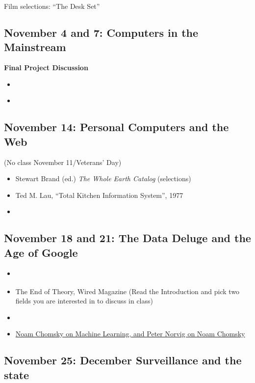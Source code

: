 Film selections: ``The Desk Set''

\subsection{November 4 and 7: Computers in the Mainstream}

\textbf{Final Project Discussion}

\begin{itemize}
\itemsep1pt\parskip0pt
\item
  \cite[Selections]{miller_assault_1971}
\item
  \cite{kidder_soul_1981}
\end{itemize}

\subsection{November 14: Personal Computers and the Web}

(No class November 11/Veterans' Day)

\begin{itemize}
\itemsep1pt\parskip0pt
\item
  Stewart Brand (ed.) \emph{The Whole Earth Catalog} (selections)
\item
  Ted M. Lau, ``Total Kitchen Information System'', 1977
\item
  \cite[Introduction; Chapters 1, 2, and 3]{berners-lee_weaving_1999}
\end{itemize}

\subsection{November 18 and 21: The Data Deluge and the Age of Google}

\begin{itemize}
\item
  \cite["After the Deluge"]{gleick_information_2011}
\item
  The End of Theory, Wired Magazine (Read the Introduction and pick two
  fields you are interested in to discuss in class)
\item
  \cite[Chapter 2]{vaidhyanathan_googlization_2011}
\item
  \href{http://norvig.com/chomsky.html}{Noam Chomsky on Machine
  Learning, and Peter Norvig on Noam Chomsky}
\end{itemize}

\subsection{November 25: December Surveillance and the state}

